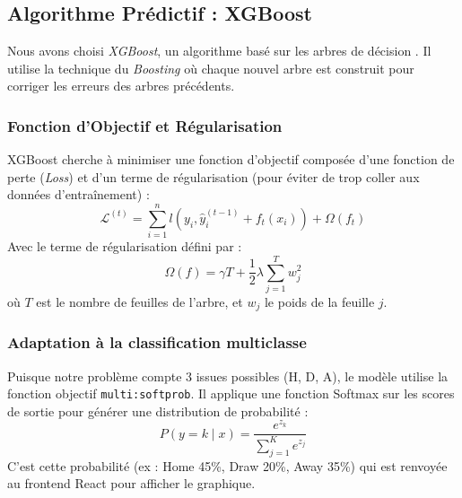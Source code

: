 \subsection{Algorithme Prédictif : XGBoost}
Nous avons choisi \textit{XGBoost}, un algorithme basé sur les arbres de décision \cite{chen2016xgboost}. Il utilise la technique du \textit{Boosting} où chaque nouvel arbre est construit pour corriger les erreurs des arbres précédents.

\subsubsection{Fonction d'Objectif et Régularisation}
XGBoost cherche à minimiser une fonction d'objectif composée d'une fonction de perte (\textit{Loss}) et d'un terme de régularisation (pour éviter de trop coller aux données d'entraînement) :
\begin{equation}
    \mathcal{L}^{(t)} = \sum_{i=1}^n l\left(y_i, \hat{y}_i^{(t-1)} + f_t(x_i)\right) + \Omega(f_t)
\end{equation}
Avec le terme de régularisation défini par :
\begin{equation}
    \Omega(f) = \gamma T + \frac{1}{2} \lambda \sum_{j=1}^T w_j^2
\end{equation}
où $T$ est le nombre de feuilles de l'arbre, et $w_j$ le poids de la feuille $j$.

\subsubsection{Adaptation à la classification multiclasse}
Puisque notre problème compte 3 issues possibles (H, D, A), le modèle utilise la fonction objectif \texttt{multi:softprob}. Il applique une fonction Softmax sur les scores de sortie pour générer une distribution de probabilité :
\begin{equation}
    P(y=k \mid x) = \frac{e^{z_k}}{\sum_{j=1}^K e^{z_j}}
\end{equation}
C'est cette probabilité (ex : Home 45\%, Draw 20\%, Away 35\%) qui est renvoyée au frontend React pour afficher le graphique.

